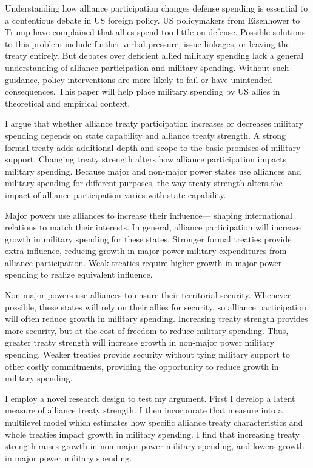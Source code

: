 \documentclass[12pt]{article}
\begin{document}
Understanding how alliance participation changes defense spending is essential to a contentious debate in US foreign policy. 
US policymakers from Eisenhower to Trump have complained that allies spend too little on defense. 
Possible solutions to this problem include further verbal pressure, issue linkages, or leaving the treaty entirely. 
But debates over deficient allied military spending lack a general understanding of alliance participation and military spending. 
Without such guidance, policy interventions are more likely to fail or have unintended consequences. 
This paper will help place military spending by US allies in theoretical and empirical context.


I argue that whether alliance treaty participation increases or decreases military spending depends on state capability and alliance treaty strength. 
A strong formal treaty adds additional depth and scope to the basic promises of military support. 
Changing treaty strength alters how alliance participation impacts military spending. 
Because major and non-major power states use alliances and military spending for different purposes, the way treaty strength alters the impact of alliance participation varies with state capability. 


Major powers use alliances to increase their influence--- shaping international relations to match their interests.
In general, alliance participation will increase growth in military spending for these states.  
Stronger formal treaties provide extra influence, reducing growth in major power military expenditures from alliance participation. 
Weak treaties require higher growth in major power spending to realize equivalent influence. 


Non-major powers use alliances to ensure their territorial security.
Whenever possible, these states will rely on their allies for security, so alliance participation will often reduce growth in military spending.   
Increasing treaty strength provides more security, but at the cost of freedom to reduce military spending. 
Thus, greater treaty strength will increase growth in non-major power military spending. 
Weaker treaties provide security without tying military support to other costly commitments, providing the opportunity to reduce growth in military spending. 


I employ a novel research design to test my argument.
First I develop a latent measure of alliance treaty strength. 
I then incorporate that measure into a multilevel model which estimates how specific alliance treaty characteristics and whole treaties impact growth in military spending.
I find that increasing treaty strength raises growth in non-major power military spending, and lowers growth in major power military spending. 
\end{document}
